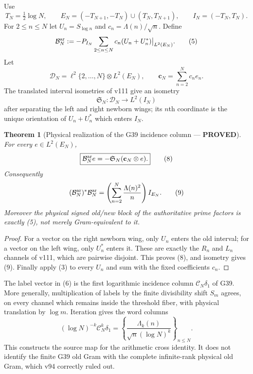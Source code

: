 \documentclass[11pt]{article}
\newcommand{\PROVED}{\textcolor{green!40!black}{\textbf{PROVED}}}
\newtheorem{theorem}{Theorem}
\begin{document}
Use
\[
 T_N=\tfrac12\log N,\qquad
 E_N=(-T_{N+1},-T_N)\cup(T_N,T_{N+1}),\qquad I_N=(-T_N,T_N).
\]
For $2\le n\le N$ let $U_n=S_{\log n}$ and
$c_n=\Lambda(n)/\sqrt n$.  Define
\begin{equation}
 \mathcal B_N^{\rm ar}
 :=-P_{I_N}\sum_{2\le n\le N}c_n(U_n+U_n^*)\big|_{L^2(E_N)}.
                                                                    \tag{5}
\end{equation}
Let
\begin{equation}
 \mathscr D_N=\ell^2\{2,\ldots,N\}\otimes L^2(E_N),\qquad
 \mathbf c_N=\sum_{n=2}^Nc_ne_n.                            \tag{6}
\end{equation}
The translated interval isometries of v111 give an isometry
\begin{equation}
 \mathfrak S_N:\mathscr D_N\longrightarrow L^2(I_N)         \tag{7}
\end{equation}
after separating the left and right newborn wings; its $n$th coordinate
is the unique orientation of $U_n+U_n^*$ which enters $I_N$.

\begin{theorem}[Physical realization of the G39 incidence column ---
\PROVED]
For every $e\in L^2(E_N)$,
\begin{equation}
 \boxed{\mathcal B_N^{\rm ar}e
 =-\mathfrak S_N(\mathbf c_N\otimes e).}                    \tag{8}
\end{equation}
Consequently
\begin{equation}
 (\mathcal B_N^{\rm ar})^*\mathcal B_N^{\rm ar}
 =\left(\sum_{n=2}^N\frac{\Lambda(n)^2}{n}\right)I_{E_N}.   \tag{9}
\end{equation}
Moreover the physical signed old/new block of the authoritative prime
factors is exactly (5), not merely Gram-equivalent to it.
\end{theorem}

\begin{proof}
For a vector on the right newborn wing, only $U_n$ enters the old interval;
for a vector on the left wing, only $U_n^*$ enters it.  These are exactly
the $R_n$ and $L_n$ channels of v111, which are pairwise disjoint.  This
proves (8), and isometry gives (9).  Finally apply (3) to every $U_n$ and
sum with the fixed coefficients $c_n$.
\end{proof}

The label vector in (6) is the first logarithmic incidence column
$\mathcal C_N\delta_1$ of G39.  More generally, multiplication of labels by
the finite divisibility shift $S_m$ agrees, on every channel which remains
inside the threshold fiber, with physical translation by $\log m$.
Iteration gives the word columns
\begin{equation}
 (\log N)^{-k}\mathcal C_N^k\delta_1
 =\left\{\frac{\Lambda_k(n)}{\sqrt n(\log N)^k}\right\}_{n\le N}.
                                                                    \tag{10}
\end{equation}
This constructs the source map for the arithmetic cross identity.  It does
not identify the finite G39 old Gram with the complete infinite-rank
physical old Gram, which v94 correctly ruled out.
\end{document}
